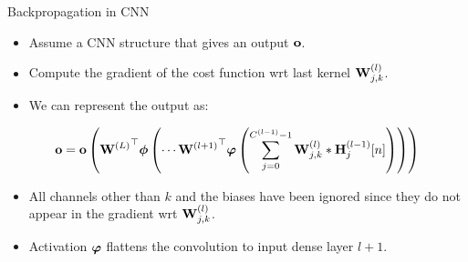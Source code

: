 \documentclass{beamer}
\begin{document}
\begin{frame}{Backpropagation in CNN}
\begin{itemize}
    \item Assume a CNN structure  that gives an output ${\bf o}$.
    \item Compute the gradient of the cost function wrt last  kernel ${\bf W}^{(l)}_{j,k}$. 
    \item We can represent the output as:
 \end{itemize}
 
    \begin{equation}
    {\bf o} = {\bf o}\left({{\bf W}^{(L)}}^\top\boldsymbol{\mathit{\phi}}\left(\cdots{{\bf W}^{(l+1)}}^\top{\boldsymbol \varphi}\left(\sum_{j=0}^{C^{(l-1)}-1} {\bf W}^{(l)}_{j,k} * {\bf H}^{(l-1)}_j[n] \right)\right)\right)
\end{equation}

\begin{itemize}
\item All channels other than $k$ and the biases have been ignored since they do not appear in the gradient wrt ${\bf W}^{(l)}_{j,k}$. 
\item Activation ${\boldsymbol \varphi}$ flattens the convolution to input  dense layer $l+1$. 
\end{itemize}
\end{frame}
\end{document}
